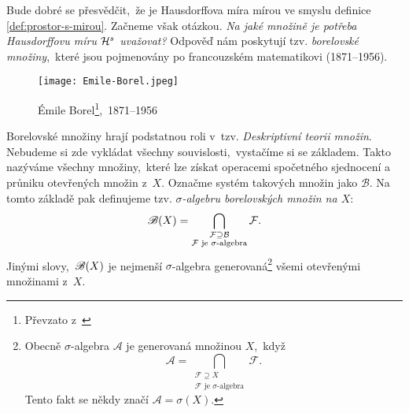 Bude dobré se přesvědčit,~že je Hausdorffova míra mírou ve smyslu definice \ref{def:prostor-s-mirou}. Začneme však otázkou. \emph{Na jaké množině je potřeba Hausdorffovu míru $\mathcal{H}^{s}$ uvažovat?} Odpověď nám poskytují tzv. \emph{borelovské množiny},~které jsou pojmenovány po francouzském matematikovi  (1871--1956).
\begin{figure}[h]
    \centering
    \texttt{[image: Emile-Borel.jpeg]}
    \caption[Émile Borel,~1871--1956]{Émile Borel\footnote{Převzato z~\cite{OConnorBorel2025}},~1871--1956}
\end{figure}
Borelovské množiny hrají podstatnou roli v~tzv. \emph{Deskriptivní teorii množin}. Nebudeme si zde vykládat všechny souvislosti,~vystačíme si se základem. Takto nazýváme všechny množiny,~které lze získat operacemi spočetného sjednocení a průniku otevřených množin z~$X$. Označme systém takových množin jako $\mathcal{B}$. Na tomto základě pak definujeme tzv. \emph{$\sigma$-algebru borelovských množin na $X$}:
\[\mathscr{B}(X)=\bigcap_{\substack{\mathcal{F}\supseteq\mathcal{B}\\\text{$\mathcal{F}$ je $\sigma$-algebra}}}\mathcal{F}.\]
Jinými slovy,~$\mathscr{B}(X)$ je nejmenší $\sigma$-algebra generovaná\footnote{Obecně $\sigma$-algebra $\mathcal{A}$ je generovaná množinou $X$,~když
\[\mathcal{A}=\bigcap_{\substack{\mathcal{F}\supseteq X\\\text{$\mathcal{F}$ je $\sigma$-algebra}}}\mathcal{F}.\]
Tento fakt se někdy značí $\mathcal{A}=\sigma(X)$.} všemi otevřenými množinami z~$X$.

